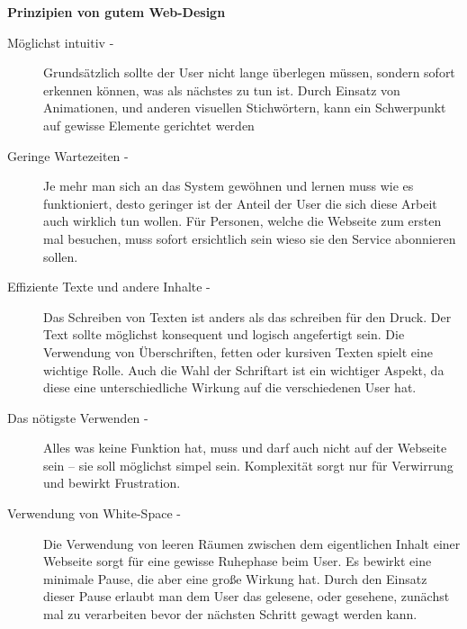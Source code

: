 \textbf{Prinzipien von gutem Web-Design}
\begin{description}
\item[Möglichst intuitiv -]
Grundsätzlich sollte der User nicht lange überlegen müssen, sondern sofort erkennen können, was als nächstes zu tun ist. Durch Einsatz von Animationen, und anderen visuellen Stichwörtern, kann ein Schwerpunkt auf gewisse Elemente gerichtet werden

\item[Geringe Wartezeiten -]
Je mehr man sich an das System gewöhnen und lernen muss wie es funktioniert, desto geringer ist der Anteil der User die sich diese Arbeit auch wirklich tun wollen. Für Personen, welche die Webseite zum ersten mal besuchen, muss sofort ersichtlich sein wieso sie den Service abonnieren sollen.

\item[Effiziente Texte und andere Inhalte -]
Das Schreiben von Texten ist anders als das schreiben für den Druck. Der Text sollte möglichst konsequent und logisch angefertigt sein. Die Verwendung von Überschriften, fetten oder kursiven Texten spielt eine wichtige Rolle. Auch die Wahl der Schriftart ist ein wichtiger Aspekt, da diese eine unterschiedliche Wirkung auf die verschiedenen User hat.

\item[Das nötigste Verwenden -]
Alles was keine Funktion hat, muss und darf auch nicht auf der Webseite sein – sie soll möglichst simpel sein. Komplexität sorgt nur für Verwirrung und bewirkt Frustration.

\item[Verwendung von White-Space -]
Die Verwendung von leeren Räumen zwischen dem eigentlichen Inhalt einer Webseite sorgt für eine gewisse Ruhephase beim User. Es bewirkt eine minimale Pause, die aber eine große Wirkung hat. Durch den Einsatz dieser Pause erlaubt man dem User das gelesene, oder gesehene, zunächst mal zu verarbeiten bevor der nächsten Schritt gewagt werden kann.
\end{description}